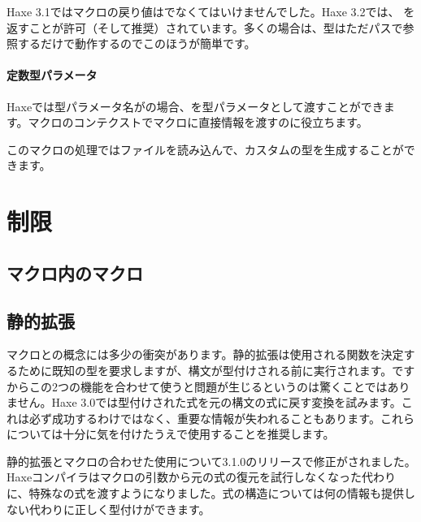 Haxe 3.1ではマクロの戻り値はでなくてはいけませんでした。Haxe 3.2では、
を返すことが許可（そして推奨）されています。多くの場合は、型はただパスで参照するだけで動作するのでこのほうが簡単です。

\paragraph{定数型パラメータ}

Haxeでは型パラメータ名がの場合、を型パラメータとして渡すことができます。マクロのコンテクストでマクロに直接情報を渡すのに役立ちます。


このマクロの処理ではファイルを読み込んで、カスタムの型を生成することができます。

\section{制限}
\label{macro-limitations}

\subsection{マクロ内のマクロ}
\label{macro-limitations-macro-in-macro}

\subsection{静的拡張}
\label{macro-limitations-static-extension}

マクロとの概念には多少の衝突があります。静的拡張は使用される関数を決定するために既知の型を要求しますが、構文が型付けされる前に実行されます。ですからこの2つの機能を合わせて使うと問題が生じるというのは驚くことではありません。Haxe 3.0では型付けされた式を元の構文の式に戻す変換を試みます。これは必ず成功するわけではなく、重要な情報が失われることもあります。これらについては十分に気を付けたうえで使用することを推奨します。


静的拡張とマクロの合わせた使用について3.1.0のリリースで修正がされました。Haxeコンパイラはマクロの引数から元の式の復元を試行しなくなった代わりに、特殊なの式を渡すようになりました。式の構造については何の情報も提供しない代わりに正しく型付けができます。

